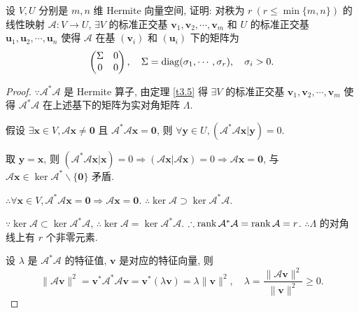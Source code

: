 \documentclass[color=black,device=normal,lang=cn,mode=geye]{elegantnote}
\begin{document}
\begin{exercisec}%
    设 $V,U$ 分别是 $m,n$ 维 Hermite 向量空间, 证明: 对秩为 $r\ (r\leq\min\{m,n\})$ 的线性映射 $\mathcal{A}:V\to U$, $\exists V$ 的标准正交基 $\boldsymbol{v}_1,\boldsymbol{v}_2,\cdots,\boldsymbol{v}_m$ 和 $U$ 的标准正交基 $\boldsymbol{u}_1,\boldsymbol{u}_2,\cdots,\boldsymbol{u}_n$ 使得 $\mathcal{A}$ 在基 $(\boldsymbol{v}_i)$ 和 $(\boldsymbol{u}_i)$ 下的矩阵为
    \[\begin{pmatrix}
        \Sigma & 0 \\
        0 & 0 \\
    \end{pmatrix},\quad\Sigma=\operatorname{diag} (\sigma_1,\cdots,\sigma_r),\quad\sigma_i>0.\]
\end{exercisec}
\begin{proof}
    $\because\mathcal{A}^*\mathcal{A}$ 是 Hermite 算子, 由定理 \ref{t3.5} 得 $\exists V$ 的标准正交基 $\boldsymbol{v}_1,\boldsymbol{v}_2,\cdots,\boldsymbol{v}_m$ 使得 $\mathcal{A}^*\mathcal{A}$ 在上述基下的矩阵为实对角矩阵 $\Lambda$.

    假设 $\exists\boldsymbol{x}\in V,\mathcal{A}\boldsymbol{x}\neq\boldsymbol{0}$ 且 $\mathcal{A}^*\mathcal{A}\boldsymbol{x}=\boldsymbol{0}$, 则 $\forall\boldsymbol{y}\in U,(\mathcal{A}^*\mathcal{A}\boldsymbol{x}|\boldsymbol{y})=0$.

    取 $\boldsymbol{y}=\boldsymbol{x}$, 则 $(\mathcal{A}^*\mathcal{A}\boldsymbol{x}|\boldsymbol{x})=0\Rightarrow(\mathcal{A}\boldsymbol{x}|\mathcal{A}\boldsymbol{x})=0\Rightarrow\mathcal{A}\boldsymbol{x}=\boldsymbol{0}$, 与 $\mathcal{A}\boldsymbol{x}\in\ker\mathcal{A}^*\backslash\{\boldsymbol{0}\}$ 矛盾.
    
    $\therefore\forall\boldsymbol{x}\in V,\mathcal{A}^*\mathcal{A}\boldsymbol{x}=\boldsymbol{0}\Rightarrow\mathcal{A}\boldsymbol{x}=\boldsymbol{0}$. $\therefore\ker\mathcal{A}\supset\ker\mathcal{A}^*\mathcal{A}$.

    $\because\ker\mathcal{A}\subset\ker\mathcal{A}^*\mathcal{A}$, $\therefore\ker\mathcal{A}=\ker\mathcal{A}^*\mathcal{A}$. $\therefore\operatorname{rank} \mathcal{A}^*\mathcal{A}=\operatorname{rank} \mathcal{A}=r$. $\therefore\Lambda$ 的对角线上有 $r$ 个非零元素.

    设 $\lambda$ 是 $\mathcal{A}^*\mathcal{A}$ 的特征值, $\boldsymbol{v}$ 是对应的特征向量, 则
    \[\|\mathcal{A}\boldsymbol{v}\|^2=\boldsymbol{v}^*\mathcal{A}^*\mathcal{A}\boldsymbol{v}=\boldsymbol{v}^*(\lambda\boldsymbol{v})=\lambda\|\boldsymbol{v}\|^2,\quad\lambda=\dfrac{\|\mathcal{A}\boldsymbol{v}\|^2}{\|\boldsymbol{v}\|^2}\geq0.\]


\end{proof}
\end{document}

